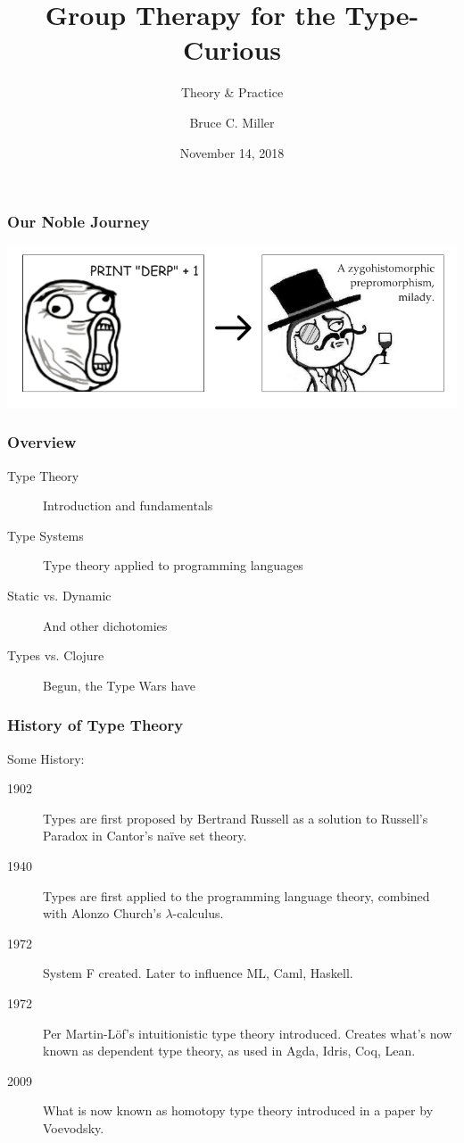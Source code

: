 \documentclass{beamer}
\title{Group Therapy for the Type-Curious}
\subtitle{Theory \& Practice}
\author{Bruce C. Miller}
\institute{bm3719@gmail.com}
\date{November 14, 2018}
\begin{document}
\begin{frame}
  \titlepage
\end{frame}

\begin{frame}
  \frametitle{Our Noble Journey}
  \centerline{\includegraphics[scale=0.4]{img/transformation.png}}
\end{frame}

\begin{frame}
  \frametitle{Overview}
  \begin{description}
  \item[Type Theory] Introduction and fundamentals
  \item[Type Systems] Type theory applied to programming languages
  \item[Static vs. Dynamic] And other dichotomies
  \item[Types vs. Clojure] Begun, the Type Wars have
  \end{description}
\end{frame}

\begin{frame}
  \frametitle{History of Type Theory}
  Some History:
  \begin{description}
  \item[1902] Types are first proposed by Bertrand Russell as a solution to
    Russell's Paradox in Cantor's na{\"i}ve set theory.
  \item[1940] Types are first applied to the programming language theory,
    combined with Alonzo Church's $\lambda$-calculus.
  \item[1972] System F created.  Later to influence ML, Caml, Haskell.
  \item[1972] Per Martin-L{\"o}f's intuitionistic type theory introduced.
    Creates what's now known as dependent type theory, as used in Agda, Idris,
    Coq, Lean.
  \item[2009] What is now known as homotopy type theory introduced in a paper
    by Voevodsky.
  \end{description}
\end{frame}
\end{document}
